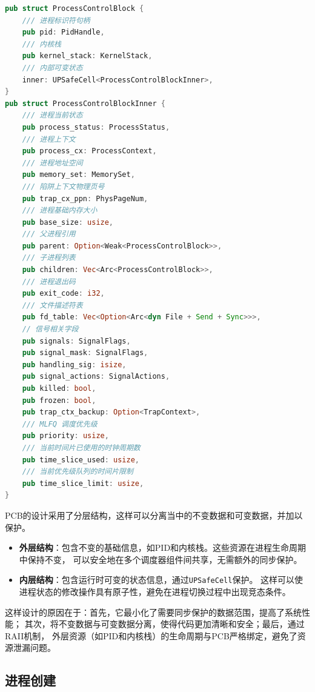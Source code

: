 \begin{lstlisting}[language=Rust,caption={进程控制块结构}, label={lst:pcb-structure}]
pub struct ProcessControlBlock {
    /// 进程标识符句柄
    pub pid: PidHandle,
    /// 内核栈
    pub kernel_stack: KernelStack,
    /// 内部可变状态
    inner: UPSafeCell<ProcessControlBlockInner>,
}
pub struct ProcessControlBlockInner {
    /// 进程当前状态
    pub process_status: ProcessStatus,
    /// 进程上下文
    pub process_cx: ProcessContext,
    /// 进程地址空间
    pub memory_set: MemorySet,
    /// 陷阱上下文物理页号
    pub trap_cx_ppn: PhysPageNum,
    /// 进程基础内存大小
    pub base_size: usize,
    /// 父进程引用
    pub parent: Option<Weak<ProcessControlBlock>>,
    /// 子进程列表
    pub children: Vec<Arc<ProcessControlBlock>>,
    /// 进程退出码
    pub exit_code: i32,
    /// 文件描述符表
    pub fd_table: Vec<Option<Arc<dyn File + Send + Sync>>>,
    // 信号相关字段
    pub signals: SignalFlags,
    pub signal_mask: SignalFlags,
    pub handling_sig: isize,
    pub signal_actions: SignalActions,
    pub killed: bool,
    pub frozen: bool,
    pub trap_ctx_backup: Option<TrapContext>,
    /// MLFQ 调度优先级
    pub priority: usize,
    /// 当前时间片已使用的时钟周期数
    pub time_slice_used: usize,
    /// 当前优先级队列的时间片限制
    pub time_slice_limit: usize,
}
\end{lstlisting}

PCB的设计采用了分层结构，这样可以分离当中的不变数据和可变数据，并加以保护。

\begin{itemize}
    \item \textbf{外层结构}：包含不变的基础信息，如PID和内核栈。这些资源在进程生命周期中保持不变，
    可以安全地在多个调度器组件间共享，无需额外的同步保护。
    \item \textbf{内层结构}：包含运行时可变的状态信息，通过\lstinline[language=Rust]{UPSafeCell}保护。
    这样可以使进程状态的修改操作具有原子性，避免在进程切换过程中出现竞态条件。
\end{itemize}

这样设计的原因在于：首先，它最小化了需要同步保护的数据范围，提高了系统性能；
其次，将不变数据与可变数据分离，使得代码更加清晰和安全；最后，通过RAII机制，
外层资源（如PID和内核栈）的生命周期与PCB严格绑定，避免了资源泄漏问题。

\subsection{进程创建}

